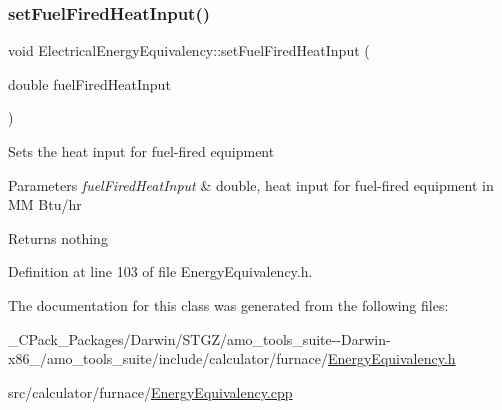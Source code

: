 \subsubsection{\texorpdfstring{set\+Fuel\+Fired\+Heat\+Input()}{setFuelFiredHeatInput()}\hspace{0.1cm}{\footnotesize\ttfamily [3/3]}}
{\footnotesize\ttfamily void Electrical\+Energy\+Equivalency\+::set\+Fuel\+Fired\+Heat\+Input (\begin{DoxyParamCaption}\item[{double}]{fuel\+Fired\+Heat\+Input }\end{DoxyParamCaption})\hspace{0.3cm}{\ttfamily [inline]}}

Sets the heat input for fuel-\/fired equipment


\begin{DoxyParams}{Parameters}
{\em fuel\+Fired\+Heat\+Input} & double, heat input for fuel-\/fired equipment in MM Btu/hr\\
\hline
\end{DoxyParams}
\begin{DoxyReturn}{Returns}
nothing 
\end{DoxyReturn}


Definition at line 103 of file Energy\+Equivalency.\+h.



The documentation for this class was generated from the following files\+:\begin{DoxyCompactItemize}
\item 
\+\_\+\+C\+Pack\+\_\+\+Packages/\+Darwin/\+S\+T\+G\+Z/amo\+\_\+tools\+\_\+suite-\/-\/\+Darwin-\/x86\+\_/amo\+\_\+tools\+\_\+suite/include/calculator/furnace/\hyperlink{___c_pack___packages_2_darwin_2_s_t_g_z_2amo__tools__suite--_darwin-x86__64_2amo__tools__suite_22deb35937168994abc5651756c82123a}{Energy\+Equivalency.\+h}\item 
src/calculator/furnace/\hyperlink{_energy_equivalency_8cpp}{Energy\+Equivalency.\+cpp}\end{DoxyCompactItemize}
